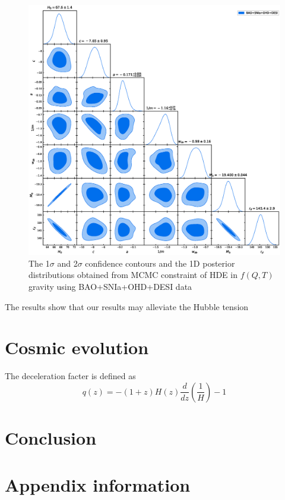 \documentclass[preprint]{aastex631}
\begin{document}
\begin{figure}
    \centering
    \includegraphics[width=1\linewidth]{./pic/getdist.eps}
    \caption{\label{fig:constraint} The 1$\sigma$ and 2$\sigma$ confidence contours and the 1D posterior distributions obtained from MCMC constraint of HDE in $f(Q,T)$ gravity using BAO+SNIa+OHD+DESI data}
\end{figure}
The results show that our results may alleviate the Hubble tension

\section{Cosmic evolution}
The deceleration facter is defined as
\begin{equation}
    q(z)=-(1+z)H(z)\frac{d}{dz}\left(\frac{1}{H}\right)-1 
\end{equation}

\section{Conclusion}
\appendix

\section{Appendix information}



{}

\end{document}
